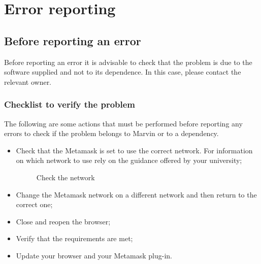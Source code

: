 \documentclass[ManualeUtente]{subfiles}
\begin{document}
\chapter{Error reporting}
\section{Before reporting an error}
Before reporting an error it is advisable to check that the problem is due to the software supplied and not to its dependence. In this case, please contact the relevant owner. \\

\subsection{Checklist to verify the problem}
The following are some actions that must be performed before reporting any errors to check if the problem belongs to Marvin or to a dependency.

\begin{itemize}
	\item Check that the Metamask is set to use the correct network. For information on which network to use rely on the guidance offered by your university;
	\begin{figure}[H]
		\centering
		\caption{Check the network}
		\label{fig:Check the network}
	\end{figure}
	\item Change the Metamask network on a different network and then return to the correct one;
	\item Close and reopen the browser;
	\item Verify that the requirements are met;
	\item Update your browser and your Metamask plug-in.
\end{itemize}
\end{document}

